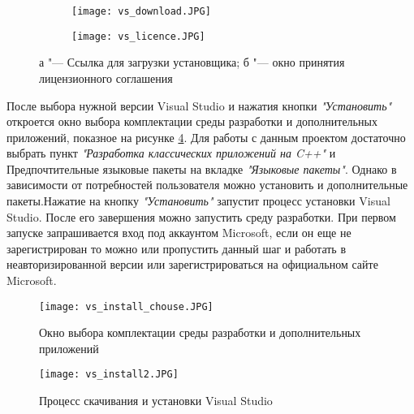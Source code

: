 \begin{figure}
    \centering
    \begin{subfigure}{0.45\textwidth}  
        \centering     
        \texttt{[image: vs\_download.JPG]}
        \caption{}
        \label{fig:vs_downolad}
    \end{subfigure}
    \begin{subfigure}{0.45\textwidth}  
        \centering
        \texttt{[image: vs\_licence.JPG]}
        \caption{}
        \label{fig:vs_licence}
    \end{subfigure}
    \caption{а "--- Ссылка для загрузки установщика; б "--- окно принятия лицензионного соглашения}
    \label{fig:vs_install1}
\end{figure}
\begin{comment}
\begin{figure}
    \centering   
    \texttt{[image: vs\_install.JPG]} 
    \caption{Выбор требуемой версии Visual Studio}
    \label{fig:vs_install2}
\end{figure}
\end{comment}
После выбора нужной версии Visual Studio и нажатия кнопки \textit{"Установить"} откроется окно выбора комплектации среды разработки и дополнительных приложений, показное на рисунке \ref{fig:vs_install_chouse}. Для работы с данным проектом достаточно выбрать пункт \textit{"Разработка классических приложений на C++"} и Предпочтительные языковые пакеты на вкладке \textit{"Языковые пакеты"}. Однако в зависимости от потребностей пользователя можно установить и дополнительные пакеты.Нажатие на кнопку \textit{"Установить"} запустит процесс установки Visual Studio. После его завершения можно запустить среду разработки. При первом запуске запрашивается вход под аккаунтом Microsoft, если он еще не зарегистрирован то можно или пропустить данный шаг и работать в неавторизированной версии или зарегистрироваться на официальном сайте Microsoft.
\begin{figure}[h]
    \centering   
    \texttt{[image: vs\_install\_chouse.JPG]} 
    \caption{Окно выбора комплектации среды разработки и дополнительных приложений }
    \label{fig:vs_install_chouse}
\end{figure} 
\begin{figure}
    \centering   
    \texttt{[image: vs\_install2.JPG]} 
    \caption{Процесс скачивания и установки Visual Studio}
    \label{fig:vs_install_progress}
\end{figure} 

